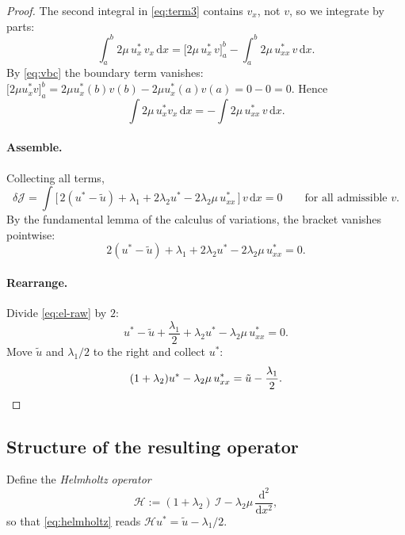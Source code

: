 \documentclass[11pt,a4paper]{article}
\theoremstyle{remark}
\newcommand{\dx}{\,\mathrm{d}x}
\newcommand{\ut}{\tilde{u}}
\newcommand{\us}{u^{*}}
\begin{document}
\begin{proof}
The second integral in \eqref{eq:term3} contains $v_x$, not $v$, so we integrate
by parts:
\begin{equation}
\int_a^b 2\mu\,\us_x\,v_x\dx
= \Big[2\mu\,\us_x\,v\Big]_a^b - \int_a^b 2\mu\,\us_{xx}\,v\dx .
\end{equation}
By \eqref{eq:vbc} the boundary term vanishes:
$\big[2\mu\us_x v\big]_a^b = 2\mu\us_x(b)v(b) - 2\mu\us_x(a)v(a) = 0 - 0 = 0$.
Hence
\begin{equation}
\int 2\mu\,\us_x v_x\dx = -\int 2\mu\,\us_{xx}\,v\dx .
\label{eq:ibp}
\end{equation}

\paragraph{Assemble.} Collecting all terms,
\begin{equation}
\delta\mathcal{J}
= \int\Big[\,2(\us-\ut) + \lambda_1 + 2\lambda_2\us - 2\lambda_2\mu\,\us_{xx}\,\Big]\,v\dx = 0
\qquad\text{for all admissible } v .
\end{equation}
By the fundamental lemma of the calculus of variations, the bracket vanishes
pointwise:
\begin{equation}
2(\us-\ut) + \lambda_1 + 2\lambda_2\us - 2\lambda_2\mu\,\us_{xx} = 0 .
\label{eq:el-raw}
\end{equation}

\paragraph{Rearrange.} Divide \eqref{eq:el-raw} by $2$:
\begin{equation}
\us - \ut + \frac{\lambda_1}{2} + \lambda_2\us - \lambda_2\mu\,\us_{xx} = 0 .
\end{equation}
Move $\ut$ and $\lambda_1/2$ to the right and collect $\us$:
\begin{equation}
(1+\lambda_2)\us - \lambda_2\mu\,\us_{xx} = \ut - \frac{\lambda_1}{2}. \qedhere
\end{equation}
\end{proof}

\subsection{Structure of the resulting operator}

Define the \emph{Helmholtz operator}
\begin{equation}
\mathcal{H} := (1+\lambda_2)\,\mathcal{I} - \lambda_2\mu\,\frac{\mathrm d^2}{\mathrm dx^2},
\end{equation}
so that \eqref{eq:helmholtz} reads $\mathcal{H}\us = \ut - \lambda_1/2$.
\end{document}
